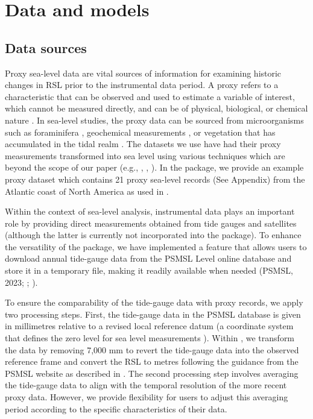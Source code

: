 \section{Data and models}\label{background}

\subsection{Data sources}\label{data}

Proxy sea-level data are vital sources of information for examining historic changes in RSL prior to the instrumental data period. A proxy refers to a characteristic that can be observed and used to estimate a variable of interest, which cannot be measured directly, and can be of physical, biological, or chemical nature \citep[e.g.,][]{Gornitz2009}. In sea-level studies, the proxy data can be sourced from microorganisms such as foraminifera \citep[e.g.,][]{Edwards2015_SLhandbook}, geochemical measurements \citep[e.g.,][]{Marshall2015_SLhandbook}, or vegetation that has accumulated in the tidal realm \citep[e.g.,][]{Kemp2015_SLhandbook}. The datasets we use have had their proxy measurements transformed into sea level using various techniques which are beyond the scope of our paper (e.g., \citet{Gehrels1994}, \citet{Shennan2015_Handbook}, \citet{Kemp2018}). In the  package, we provide an example proxy dataset which contains 21 proxy sea-level records (See Appendix) from the Atlantic coast of North America as used in \citet{Upton2023noisy}.

Within the context of sea-level analysis, instrumental data plays an important role by providing direct measurements obtained from tide gauges and satellites (although the latter is currently not incorporated into the  package). To enhance the versatility of the package, we have implemented a feature that allows users to download annual tide-gauge data from the PSMSL Level online database and store it in a temporary file, making it readily available when needed (PSMSL, 2023; \citet{Holgate_PSMSL2013}; \citet{Woodworth2003}).

To ensure the comparability of the tide-gauge data with proxy records, we apply two processing steps. First, the tide-gauge data in the PSMSL database is given in millimetres relative to a revised local reference datum (a coordinate system that defines the zero level for sea level measurements \citet{pugh_woodworth_2014b}). Within , we transform the data by removing 7,000 mm to revert the tide-gauge data into the observed reference frame and convert the RSL to metres following the guidance from the PSMSL website as described in \citet{PSMSLinstruction}. The second processing step involves averaging the tide-gauge data to align with the temporal resolution of the more recent proxy data. However, we provide flexibility for users to adjust this averaging period according to the specific characteristics of their data.

